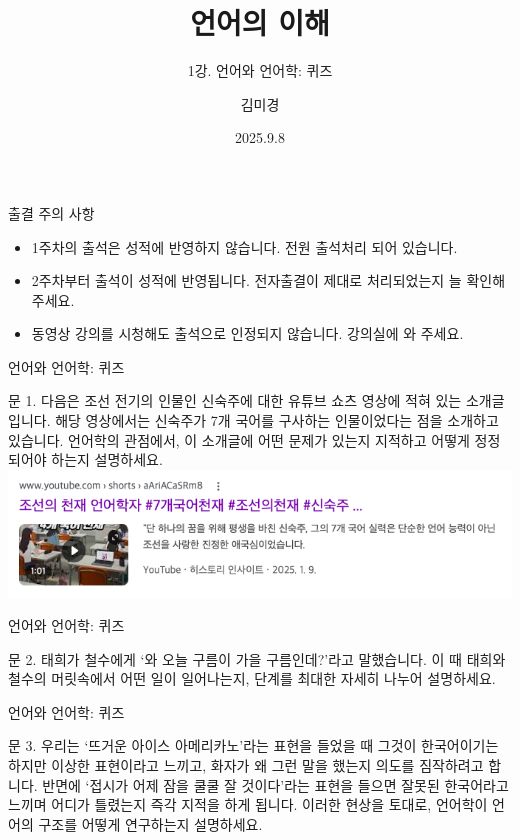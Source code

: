 \documentclass[11pt, aspectratio=169]{beamer}
\title{언어의 이해}
\subtitle{1강. 언어와 언어학: 퀴즈}
\author{김미경}
\date{2025.9.8}
\begin{document}
\frame{\titlepage}

\begin{frame}[t]{출결 주의 사항}
    \begin{itemize}
        \item 1주차의 출석은 성적에 반영하지 않습니다. 전원 출석처리 되어 있습니다.
        \item 2주차부터 출석이 성적에 반영됩니다. 전자출결이 제대로 처리되었는지 늘 확인해 주세요. 
        \item 동영상 강의를 시청해도 출석으로 인정되지 않습니다. 강의실에 와 주세요. 
    \end{itemize}
\end{frame}

\begin{frame}[t]{언어와 언어학: 퀴즈}
  \begin{block}{문 1.}
    다음은 조선 전기의 인물인 신숙주에 대한 유튜브 쇼츠 영상에 적혀 있는 소개글입니다. 해당 영상에서는 신숙주가 7개 국어를 구사하는 인물이었다는 점을 소개하고 있습니다. 언어학의 관점에서, 이 소개글에 어떤 문제가 있는지 지적하고 어떻게 정정되어야 하는지 설명하세요.\\
    \includegraphics[width=1.0\textwidth]{img/linguist_vs_polyglot.png}
  \end{block}
\end{frame}

\begin{frame}[t]{언어와 언어학: 퀴즈}
  \begin{block}{문 2.}
    태희가 철수에게 ‘와 오늘 구름이 가을 구름인데?’라고 말했습니다. 이 때 태희와 철수의 머릿속에서 어떤 일이 일어나는지, 단계를 최대한 자세히 나누어 설명하세요. 
  \end{block}
\end{frame}

\begin{frame}[t]{언어와 언어학: 퀴즈}
  \begin{block}{문 3.}
    우리는 ‘뜨거운 아이스 아메리카노’라는 표현을 들었을 때 그것이 한국어이기는 하지만 이상한 표현이라고 느끼고, 화자가 왜 그런 말을 했는지 의도를 짐작하려고 합니다. 반면에 ‘접시가 어제 잠을 쿨쿨 잘 것이다’라는 표현을 들으면 잘못된 한국어라고 느끼며 어디가 틀렸는지 즉각 지적을 하게 됩니다. 이러한 현상을 토대로, 언어학이 언어의 구조를 어떻게 연구하는지 설명하세요.
  \end{block}
\end{frame}
\end{document}
